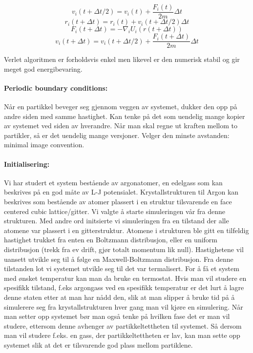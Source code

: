 \documentclass[a4paper,10pt]{article}
\begin{document}
\begin{equation}
 v_i(t+\Delta t/2) = v_i(t) + \frac{F_i(t)}{2m}\Delta t
\end{equation}
\begin{equation}
 r_i(t+\Delta t) = r_i(t) +v_i(t+\Delta t/2)\Delta t
\end{equation}
\begin{equation}
 F_i(t+\Delta t) = -\nabla_iU_i(r(t+\Delta t))
\end{equation}
\begin{equation}
 v_i(t+\Delta t) = v_i(t+\Delta t/2) +\frac{F_i(t+\Delta t)}{2m}\Delta t
\end{equation}

Verlet algoritmen er forholdsvis enkel men likevel er den numerisk stabil og gir meget god energibevaring. 

\paragraph{Periodic boundary conditions:} Når en partikkel beveger seg gjennom veggen av systemet, dukker den opp på andre siden med samme hastighet. Kan tenke på det som uendelig mange kopier av systemet ved siden av hverandre. Når man skal regne ut kraften mellom to partikler, så er det uendelig mange versjoner. Velger den minste avstanden: minimal image convention.

\paragraph{Initialisering:} Vi har studert et system bestående av argonatomer, en edelgass som kan beskrives på en god måte av L-J potensialet. Krystallstrukturen til Argon kan beskrives som bestående av atomer plassert i en struktur tilsvarende en face centered cubic lattice/gitter. Vi valgte å starte simuleringen vår fra denne strukturen. Med andre ord initsierte vi simuleringen fra en tilstand der alle atomene var plassert i en gitterstruktur. Atomene i strukturen ble gitt en tilfeldig hastighet trukket fra enten en Boltzmann distribusjon, eller en uniform distribusjon (trekk fra ev drift, gjør totalt momentum lik null). Hastighetene vil uansett utvikle seg til å følge en Maxwell-Boltzmann distribusjon. Fra denne tilstanden lot vi systemet utvikle seg til det var termalisert. For å få et system med ønsket temperatur kan man da bruke en termostat. Hvis man vil studere en spesifikk tilstand, f.eks argongass ved en spesifikk temperatur er det lurt å lagre denne staten etter at man har nådd den, slik at man slipper å bruke tid på å simulerere seg fra krystallstrukturen hver gang man vil kjøre en simulering. Når man setter opp systemet bør man også tenke på hvilken fase det er man vil studere, ettersom denne avhenger av partikkeltettheten til systemet. Så dersom man vil studere f.eks. en gass, der partikkeltettheten er lav, kan man sette opp systemet slik at det er tilsvarende god plass mellom partiklene. 
\end{document}
